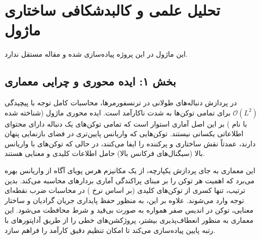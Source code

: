 \section{تحلیل علمی و کالبدشکافی ساختاری ماژول }

این ماژول در این پروژه پیاده‌سازی شده و مقاله مستقل ندارد.
\label{sec:mixattention_moska}

\subsection*{بخش ۱: ایده محوری و چرایی معماری }
در پردازش دنباله‌های طولانی در ترنسفورمرها، محاسبات کامل توجه با پیچیدگی $\mathcal{O}(L^2)$ برای تمامی توکن‌ها به شدت ناکارآمد است. ایده محوری ماژول  (شناخته شده با نام ) بر این اصل آماری استوار است که تمامی توکن‌های یک دنباله دارای محتوای اطلاعاتی یکسانی نیستند. توکن‌هایی که واریانس پایین‌تری در فضای بازنمایی پنهان دارند، عمدتاً نقش ساختاری و پرکننده را ایفا می‌کنند، در حالی که توکن‌های با واریانس بالا (سیگنال‌های فرکانس بالا) حامل اطلاعات کلیدی و معنایی هستند. 

این معماری به جای پردازش یکپارچه، از یک مکانیزم هرس پویای آگاه از واریانس  بهره می‌برد که اهمیت هر توکن را بر مبنای پراکندگی آماری بردارهای  محاسبه می‌کند. بدین ترتیب، تنها کسری از توکن‌های کلیدی (بر اساس نرخ ) در محاسبات ضرب نقطه‌ای توجه وارد می‌شوند. علاوه بر این، به منظور حفظ پایداری جریان گرادیان و ساختار معنایی، توکن \lr{[CLS]} در اندیس صفر همواره به صورت بی‌قید و شرط محافظت می‌شود. این معماری به منظور انعطاف‌پذیری بیشتر، پروژکشن‌های خطی را از طریق آداپتورهای   با رتبه پایین  پیاده‌سازی می‌کند تا امکان تنظیم دقیق کارآمد  را فراهم سازد.

